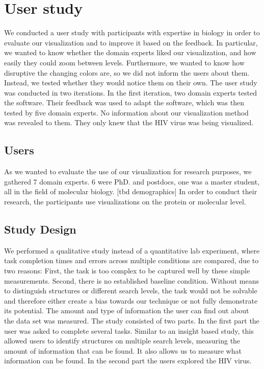 \documentclass[review,journal]{vgtc}         %
\begin{document}
\section{User study}
We conducted a user study with participants with expertise in biology in order to evaluate our visualization and to improve it based on the feedback.
In particular, we wanted to know whether the domain experts liked our visualization, and how easily they could zoom between levels. 
Furthermore, we wanted to know how disruptive the changing colors are, so we did not inform the users about them. Instead, we tested whether they would notice them on their own.
The user study was conducted in two iterations. 
In the first iteration, two domain experts tested the software. 
Their feedback was used to adapt the software, which was then tested by five domain experts.
No information about our visualization method was revealed to them. They only knew that the HIV virus was being visualized.

\subsection{Users}
As we wanted to evaluate the use of our visualization for research purposes, we gathered 7 domain experts. 
6 were PhD. and postdocs, one was a master student, all in the field of molecular biology. [tbd demographics]
In order to conduct their research, the participants use visualizations on the protein or molecular level.


\subsection{Study Design}
We performed a qualitative study instead of a quantitative lab experiment, where task completion times and errors across multiple conditions are compared, due to two reasons: First, the task is too complex to be captured well by these simple measurements. 
Second, there is no established baseline condition.
Without means to distinguish structures or different search levels, the task would not be solvable and therefore either create a bias towards our technique or not fully demonstrate its potential.
The amount and type of information the user can find out about the data set was measured. 
The study consisted of two parts. In the first part the user was asked to complete several tasks. 
Similar to an insight based study, this allowed users to identify structures on multiple search levels, measuring the amount of information that can be found.
It also allows us to measure what information can be found.  
In the second part the users explored the HIV virus. 
\end{document}
